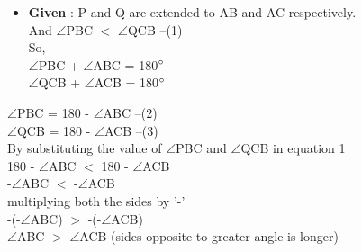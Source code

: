 \begin{frame}
\begin{itemize}

\item \textbf{Given} : P and Q are extended to AB and AC respectively.\\
And $\angle$PBC $<$ $\angle$QCB --(1)\\
So,\\
$\angle$PBC + $\angle$ABC = 180$\degree$  \\
$\angle$QCB + $\angle$ACB = 180$\degree$  \\
\end{itemize}
$\angle$PBC = 180 - $\angle$ABC --(2)\\
$\angle$QCB = 180 - $\angle$ACB --(3)\\
By substituting the value of $\angle$PBC and $\angle$QCB in equation 1 \\
180 - $\angle$ABC $<$ 180 - $\angle$ACB\\
-$\angle$ABC $<$ -$\angle$ACB\\
multiplying both the sides by '-'\\
-(-$\angle$ABC) $>$  -(-$\angle$ACB)\\
$\angle$ABC $>$ $\angle$ACB   (sides opposite to greater angle is longer)\\
\end{frame}